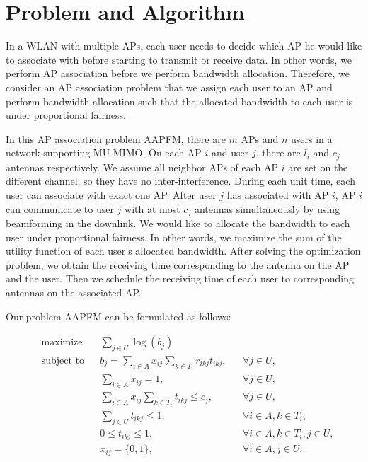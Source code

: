 \section{Problem and Algorithm}
	In a WLAN with multiple APs, each user needs to decide which AP he would like to associate with before starting to transmit or receive data. In other words, we perform AP association before we perform bandwidth allocation. Therefore, we consider an AP association problem that we assign each user to an AP and perform bandwidth allocation such that the allocated bandwidth to each user is under proportional fairness. 
	
	In this AP association problem AAPFM, there are $m$ APs and $n$ users in a network supporting MU-MIMO. On each AP $i$ and user $j$, there are $l_i$ and $c_j$ antennas respectively. We assume all neighbor APs of each AP $i$ are set on the different channel, so they have no inter-interference. During each unit time, each user can associate with exact one AP. After user $j$ has associated with AP $i$, AP $i$ can communicate to user $j$ with at most $c_j$ antennas simultaneously by using beamforming in the downlink. We would like to allocate the bandwidth to each user under proportional fairness. In other words, we maximize the sum of the utility function of each user's allocated bandwidth. After solving the optimization problem, we obtain the receiving time corresponding to the antenna on the AP and the user. Then we schedule the receiving time of each user to corresponding antennas on the associated AP. 
	
	Our problem AAPFM can be formulated as follows:

	\begin{equation}
		\begin{aligned}
			& \text{maximize} 
			& & \sum_{j \in U} \log (b_{j}) \\
			& \text{subject to} 
			& & b_{j} = \sum_{i \in A} x_{ij} \sum_{k \in T_{i}} r_{ikj} t_{ikj}, & & \forall j \in U, \\
			& & & \sum_{i \in A} x_{ij} = 1, & & \forall j \in U, \\
			& & & \sum_{i \in A} x_{ij} \sum_{k \in T_i } t_{ikj} \le c_j, & & \forall j \in U, \\
			& & & \sum_{j\in U} t_{ikj} \le 1, & & \forall i \in A, k \in T_i,  \\
			& & & 0 \le t_{ikj} \le 1, & & \forall i \in A, k \in T_i, j \in U, \\
			& & & x_{ij} = \{0, 1\}, & & \forall i \in A, j \in U. \\
		\end{aligned}
	\end{equation}

